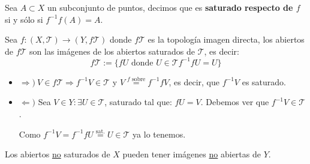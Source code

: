 \begin{defi}
Sea $A \subset X$ un subconjunto de puntos, decimos que es \textbf{saturado respecto de $f$} si y sólo si $f^{-1}f\left( A \right) = A$.
\end{defi}

\begin{prop}
Sea $f : (X, \mathcal{T}) \rightarrow (Y, f\mathcal{T})$ donde $f\mathcal{T}$ es la topología imagen directa, los abiertos de $f\mathcal{T}$ son las imágenes de los abiertos saturados de $\mathcal{T}$, es decir:
\[
f\mathcal{T} := \{fU \mbox{ donde } U \in \mathcal{T} f^{-1}fU = U\}
\]
\end{prop}
\begin{demo}
\begin{itemize}
    \item $\Rightarrow)\ V \in f\mathcal{T} \Rightarrow f^{-1}V \in \mathcal{T}$ y $V \stackrel{f \text{ sobre}}{=} f^{-1}fV$, es decir, que $f^{-1} V$ es saturado.
    \item $\Leftarrow)$ Sea $V \in Y: \exists U \in \mathcal{T}$, saturado tal que: $fU = V$. Debemos ver que $f^{-1}V \in \mathcal{T}$.

    Como $f^{-1}V = f^{-1}fU \stackrel{\text{sat.}}{=} U \in \mathcal{T}$ ya lo tenemos.
\end{itemize}
\end{demo}

\begin{obs}
Los abiertos \underline{no} saturados de $X$ pueden tener imágenes \underline{no} abiertas de $Y$. 
\end{obs}

